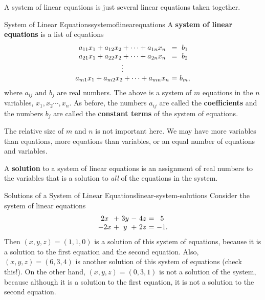 A system of linear equations is just several linear equations taken together.

\begin{definition}{System of Linear Equations}{systemoflinearequations}
A \textbf{system of linear equations} is a list of equations
\begin{equation*}
\begin{array}{c@{~}c@{~}c}
a_{11}x_{1}+a_{12}x_{2}+\cdots +a_{1n}x_{n}&=&b_{1} \\
a_{21}x_{1}+a_{22}x_{2}+\cdots +a_{2n}x_{n}&=&b_{2} \\
\vdots \\
a_{m1}x_{1}+a_{m2}x_{2}+\cdots +a_{mn}x_{n}&=&b_{m},
\end{array}
\end{equation*}
where $a_{ij}$ and $b_{j}$ are real numbers. The above is a system
of $m$ equations in the $n$ variables, $x_{1},x_{2}\cdots ,x_{n}$.
As before, the numbers $a_{ij}$ are called the
\textbf{coefficients} and the numbers $b_{j}$ are
called the \textbf{constant terms} of the system
of equations.
\end{definition}

The relative size of $m$ and $n$ is not important here. We may have
more variables than equations, more equations than variables, or an
equal number of equations and variables. 

A \textbf{solution} to a
system of linear equations is an assignment of real numbers to the
variables that is a solution to {\em all} of the equations in the
system.

\begin{example}{Solutions of a System of Linear Equations}{linear-system-solutions}
  Consider the system of linear equations
  \begin{equation*}
    \begin{array}{c@{~}c@{~}c@{~}c@{~}c@{~}c@{~}c}
      2x&+&3y&-&4z &=& 5\\
      -2x&+&y&+&2z &=& -1.
    \end{array}
  \end{equation*}
  Then $(x,y,z)=(1,1,0)$ is a solution of this system of equations,
  because it is a solution to the first equation and the second
  equation. Also, $(x,y,z)=(6,3,4)$ is another solution of this system
  of equations (check this!).  On the other hand, $(x,y,z)=(0,3,1)$ is
  not a solution of the system, because although it is a solution to
  the first equation, it is not a solution to the second equation.
\end{example}

